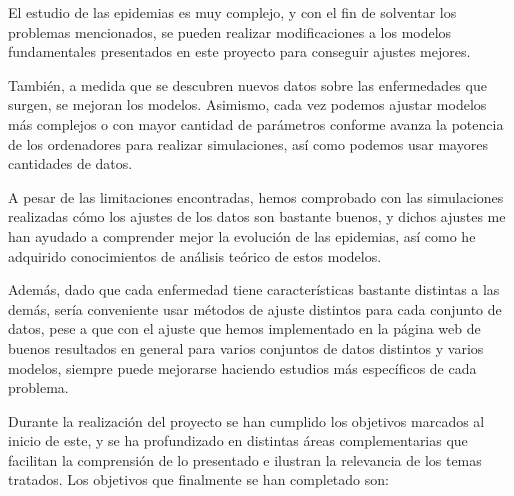 El estudio de las epidemias es muy complejo, y con el fin de solventar los problemas mencionados, se pueden realizar modificaciones a los modelos fundamentales presentados en este proyecto para conseguir ajustes mejores.

También, a medida que se descubren nuevos datos sobre las enfermedades que surgen, se mejoran los modelos. Asimismo, cada vez podemos ajustar modelos más complejos o con mayor cantidad de parámetros conforme avanza la potencia de los ordenadores para realizar simulaciones, así como podemos usar mayores cantidades de datos.

A pesar de las limitaciones encontradas, hemos comprobado con las simulaciones realizadas cómo los ajustes de los datos son bastante buenos, y dichos ajustes me han ayudado a comprender mejor la evolución de las epidemias, así como he adquirido conocimientos de análisis teórico de estos modelos.

Además, dado que cada enfermedad tiene características bastante distintas a las demás, sería conveniente usar métodos de ajuste distintos para cada conjunto de datos, pese a que con el ajuste que hemos implementado en la página web de buenos resultados en general para varios conjuntos de datos distintos y varios modelos, siempre puede mejorarse haciendo estudios más específicos de cada problema.

Durante la realización del proyecto se han cumplido los objetivos marcados al inicio de este, y se ha profundizado en distintas áreas complementarias que facilitan la comprensión de lo presentado e ilustran la relevancia de los temas tratados. Los objetivos que finalmente se han completado son:

